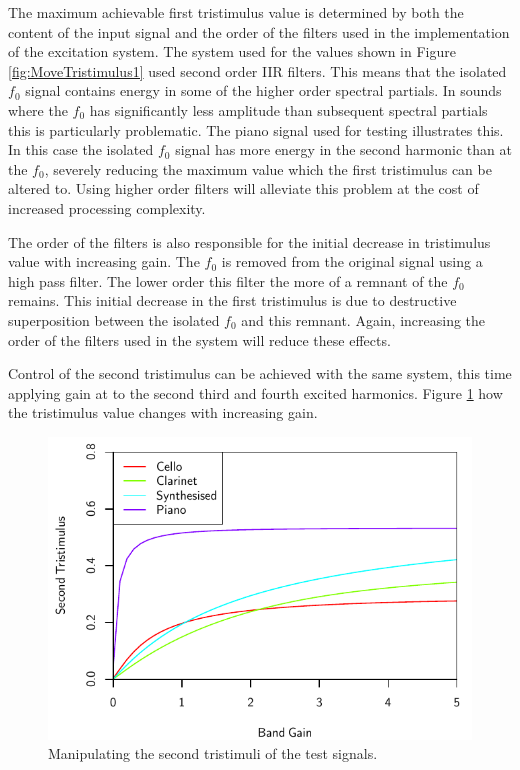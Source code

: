 		The maximum achievable first tristimulus value is determined by both the content of the input signal and
		the order of the filters used in the implementation of the excitation system. The system used for the
		values shown in Figure \ref{fig:MoveTristimulus1} used second order IIR filters. This means that the
		isolated $f_{0}$ signal contains energy in some of the higher order spectral partials. In sounds where the
		$f_{0}$ has significantly less amplitude than subsequent spectral partials this is particularly
		problematic. The piano signal used for testing illustrates this. In this case the isolated $f_{0}$ signal
		has more energy in the second harmonic than at the $f_{0}$, severely reducing the maximum value which the
		first tristimulus can be altered to.  Using higher order filters will alleviate this problem at the cost of
		increased processing complexity.

		The order of the filters is also responsible for the initial decrease in tristimulus value with increasing
		gain. The $f_{0}$ is removed from the original signal using a high pass filter. The lower order this filter
		the more of a remnant of the $f_{0}$ remains. This initial decrease in the first tristimulus is due to
		destructive superposition between the isolated $f_{0}$ and this remnant. Again, increasing the order of the
		filters used in the system will reduce these effects.

		Control of the second tristimulus can be achieved with the same system, this time applying gain at to the
		second third and fourth excited harmonics. Figure \ref{fig:MoveTristimulus2} how the tristimulus value
		changes with increasing gain.

		\begin{figure}[h!]
			\centering
			\includegraphics{chapter6/Images/MoveTristimulus2.pdf}
			\caption{Manipulating the second tristimuli of the test signals.}
			\label{fig:MoveTristimulus2}
		\end{figure}

